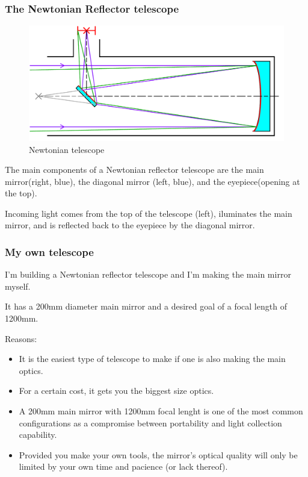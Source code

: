 \documentclass{beamer}
\begin{document}
\begin{frame}
\frametitle{The Newtonian Reflector telescope}
\begin{figure}
\includegraphics[scale=0.3]{assets/Newtonian_telescope2.pdf}
\caption{Newtonian telescope}
\end{figure}
The main components of a Newtonian reflector telescope are the main mirror\footnotemark (right, blue),
the diagonal mirror (left, blue), and the eyepiece\footnotemark (opening at the top).

Incoming light comes from the top of the telescope (left), iluminates the main mirror, and is reflected back to the eyepiece by the diagonal mirror.
\end{frame}

\begin{frame}
\frametitle{My own telescope}
I'm building a Newtonian reflector telescope and I'm making the main mirror myself.

It has a 200mm diameter main mirror and a desired goal of a focal length of 1200mm.

Reasons:
\begin{itemize}
\item It is the easiest type of telescope to make if one is also making the main optics.
\item For a certain cost, it gets you the biggest size optics.
\item A 200mm main mirror with 1200mm focal lenght is one of the most common configurations as a compromise between portability and light collection capability.
\item Provided you make your own tools, the mirror's optical quality will only be limited by your own time and pacience (or lack thereof).
\end{itemize}
\end{frame}
\end{document}
